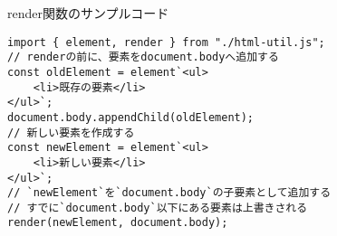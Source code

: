 \begin{listtitle}
render関数のサンプルコード
\end{listtitle}
\begin{lstlisting}
import { element, render } from "./html-util.js";
// renderの前に、要素をdocument.bodyへ追加する
const oldElement = element`<ul>
    <li>既存の要素</li>
</ul>`;
document.body.appendChild(oldElement);
// 新しい要素を作成する
const newElement = element`<ul>
    <li>新しい要素</li>
</ul>`;
// `newElement`を`document.body`の子要素として追加する
// すでに`document.body`以下にある要素は上書きされる
render(newElement, document.body);
\end{lstlisting}
\listend
